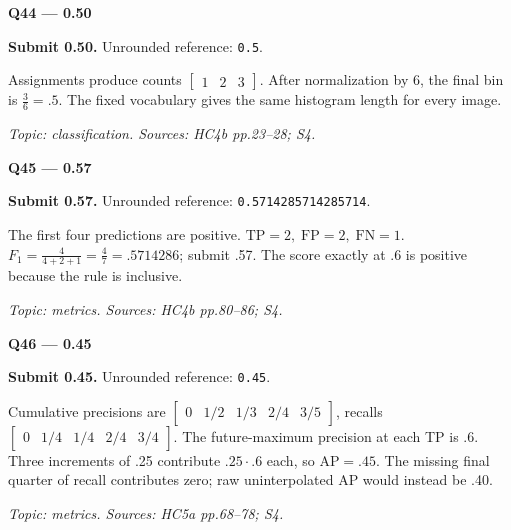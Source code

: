 \documentclass[11pt,a4paper]{article}
\begin{document}
\par\vspace{12pt}
\begin{minipage}{\linewidth}
\textbf{Q44 — 0.50}\par\smallskip
\textbf{Submit 0.50.} Unrounded reference: \texttt{0.5}.\par
Assignments produce counts \(\begin{bmatrix}1&2&3\end{bmatrix}\). After normalization by 6,\allowbreak{} the final bin is \(\frac{3}{6}=.5\). The fixed vocabulary gives the same histogram length for every image.\par
{\small\itshape Topic: classification. Sources: HC4b pp.23–28; S4.}

\end{minipage}
\par\vspace{12pt}
\begin{minipage}{\linewidth}
\textbf{Q45 — 0.57}\par\smallskip
\textbf{Submit 0.57.} Unrounded reference: \texttt{0.5714285714285714}.\par
The first four predictions are positive. \(\mathrm{TP}=2,\;\mathrm{FP}=2,\;\mathrm{FN}=1\). \(F_1=\frac{4}{4+2+1}=\frac{4}{7}=.5714286\); submit .57. The score exactly at .6 is positive because the rule is inclusive.\par
{\small\itshape Topic: metrics. Sources: HC4b pp.80–86; S4.}

\end{minipage}
\par\vspace{12pt}
\begin{minipage}{\linewidth}
\textbf{Q46 — 0.45}\par\smallskip
\textbf{Submit 0.45.} Unrounded reference: \texttt{0.45}.\par
Cumulative precisions are \(\begin{bmatrix}0&1/2&1/3&2/4&3/5\end{bmatrix}\),\allowbreak{} recalls \(\begin{bmatrix}0&1/4&1/4&2/4&3/4\end{bmatrix}\). The future-maximum precision at each TP is .6. Three increments of .25 contribute \(.25\cdot.6\) each,\allowbreak{} so \(\mathrm{AP}=.45\). The missing final quarter of recall contributes zero; raw uninterpolated AP would instead be .40.\par
{\small\itshape Topic: metrics. Sources: HC5a pp.68–78; S4.}

\end{minipage}
\end{document}

